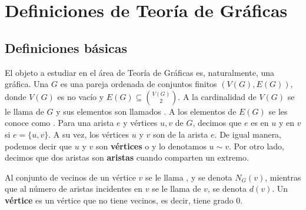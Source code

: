 \chapter{Definiciones de Teor\'ia de Gr\'aficas}%
\label{cap:defs grafs}

\section{Definiciones b\'asicas}%
\label{sec:def-basicas}

El objeto a estudiar en el \'area de Teor\'ia de Gr\'aficas es, naturalmente,
una gr\'afica. Una  $G$ es una pareja ordenada de conjuntos
finitos $(V(G), E(G))$, donde $V(G)$ es no vac\'io y $E(G) \subseteq
\binom{V(G)}{2}$. A la cardinalidad de $V(G)$ se le llama
 de $G$ y sus elementos son llamados
. A los elementos de $E(G)$ se les conoce como
. Para una arista $e$ y v\'ertices $u, v$ de $G$, decimos que
$e$ es  en $u$ y en $v$ si $e= \{u, v\}$. A su
vez, los v\'ertices $u$ y $v$ son  de la arista
$e$. De igual manera, podemos decir que $u$ y $v$ son \textbf{v\'ertices}
 o
 y lo denotamos $u \sim v$. Por otro lado,
decimos que dos aristas son \textbf{aristas}
 cuando comparten un
extremo. 

Al conjunto de vecinos de un v\'ertice $v$ se le llama , y se
denota $N_G(v)$, mientras que al n\'umero de aristas incidentes en $v$ se le
llama  de $v$, se denota $d(v)$. Un \textbf{v\'ertice}
 es  un v\'ertice que no tiene vecinos, es
decir, tiene grado $0$.

